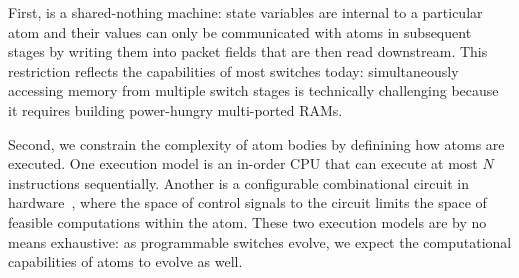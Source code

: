 First, \absmachine is a shared-nothing machine: state variables are internal to
a particular atom and their values can only be communicated with atoms in
subsequent stages by writing them into packet fields that are then read
downstream.  This restriction reflects the capabilities of most switches today:
simultaneously accessing memory from multiple switch stages is technically
challenging because it requires building power-hungry multi-ported RAMs.

Second, we constrain the complexity of atom bodies by definining how atoms are
executed. One execution model is an in-order CPU that can execute at most $N$
instructions sequentially. Another is a configurable combinational circuit in
hardware~\cite{dataflow}, where the space of control signals to the circuit
limits the space of feasible computations within the atom. These two execution
models are by no means exhaustive: as programmable switches evolve, we expect
the computational capabilities of atoms to evolve as well.


